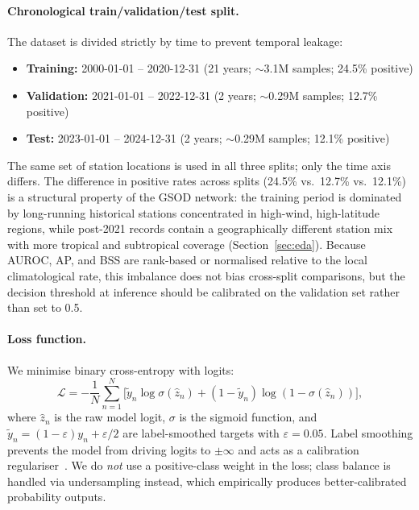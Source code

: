 \documentclass{article}
\begin{document}
\paragraph{Chronological train/validation/test split.}
The dataset is divided strictly by time to prevent temporal leakage:
\begin{itemize}
    \item \textbf{Training:} 2000-01-01 -- 2020-12-31 (21 years; $\sim$3.1M samples; 24.5\% positive)
    \item \textbf{Validation:} 2021-01-01 -- 2022-12-31 (2 years; $\sim$0.29M samples; 12.7\% positive)
    \item \textbf{Test:} 2023-01-01 -- 2024-12-31 (2 years; $\sim$0.29M samples; 12.1\% positive)
\end{itemize}
The same set of station locations is used in all three splits; only the time axis differs. The difference in positive rates across splits (24.5\% vs.\ 12.7\% vs.\ 12.1\%) is a structural property of the GSOD network: the training period is dominated by long-running historical stations concentrated in high-wind, high-latitude regions, while post-2021 records contain a geographically different station mix with more tropical and subtropical coverage (Section~\ref{sec:eda}). Because AUROC, AP, and BSS are rank-based or normalised relative to the local climatological rate, this imbalance does not bias cross-split comparisons, but the decision threshold at inference should be calibrated on the validation set rather than set to 0.5.

\paragraph{Loss function.}
We minimise binary cross-entropy with logits:
\begin{equation}
    \mathcal{L} = -\frac{1}{N}\sum_{n=1}^{N}\bigl[\tilde{y}_n \log\sigma(\hat{z}_n) + (1-\tilde{y}_n)\log(1-\sigma(\hat{z}_n))\bigr],
\end{equation}
where $\hat{z}_n$ is the raw model logit, $\sigma$ is the sigmoid function, and $\tilde{y}_n = (1-\varepsilon)y_n + \varepsilon/2$ are label-smoothed targets with $\varepsilon = 0.05$. Label smoothing prevents the model from driving logits to $\pm\infty$ and acts as a calibration regulariser~\cite{muller2019does}. We do \emph{not} use a positive-class weight in the loss; class balance is handled via undersampling instead, which empirically produces better-calibrated probability outputs.
\end{document}
